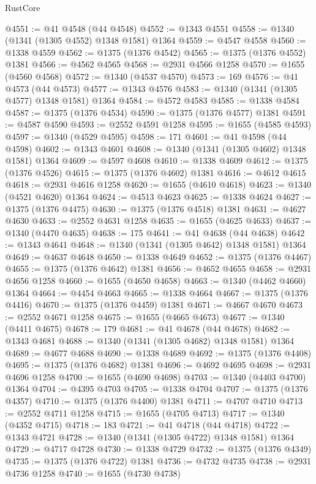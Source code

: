 \begin{lexlean}{RustCore}
\begin{coremodule}
@4551 := @41 @4548 (@44 @4548)
@4552 := @1343 @4551
@4558 := @1340 (@1341 (@1305 @4552) @1348 @1581) @1364
@4559 := @4547 @4558
@4560 := @1338 @4559
@4562 := @1375 (@1376 @4542)
@4565 := @1375 (@1376 @4552) @1381
@4566 := @4562 @4565
@4568 := @2931 @4566 @1258
@4570 := @1655 (@4560 @4568)
@4572 := @1340 (@4537 @4570)
@4573 := 169
@4576 := @41 @4573 (@44 @4573)
@4577 := @1343 @4576
@4583 := @1340 (@1341 (@1305 @4577) @1348 @1581) @1364
@4584 := @4572 @4583
@4585 := @1338 @4584
@4587 := @1375 (@1376 @4534)
@4590 := @1375 (@1376 @4577) @1381
@4591 := @4587 @4590
@4593 := @2552 @4591 @1258
@4595 := @1655 (@4585 @4593)
@4597 := @1340 (@4529 @4595)
@4598 := 171
@4601 := @41 @4598 (@44 @4598)
@4602 := @1343 @4601
@4608 := @1340 (@1341 (@1305 @4602) @1348 @1581) @1364
@4609 := @4597 @4608
@4610 := @1338 @4609
@4612 := @1375 (@1376 @4526)
@4615 := @1375 (@1376 @4602) @1381
@4616 := @4612 @4615
@4618 := @2931 @4616 @1258
@4620 := @1655 (@4610 @4618)
@4623 := @1340 (@4521 @4620) @1364
@4624 := @4513 @4623
@4625 := @1338 @4624
@4627 := @1375 (@1376 @4475)
@4630 := @1375 (@1376 @4518) @1381
@4631 := @4627 @4630
@4633 := @2552 @4631 @1258
@4635 := @1655 (@4625 @4633)
@4637 := @1340 (@4470 @4635)
@4638 := 175
@4641 := @41 @4638 (@44 @4638)
@4642 := @1343 @4641
@4648 := @1340 (@1341 (@1305 @4642) @1348 @1581) @1364
@4649 := @4637 @4648
@4650 := @1338 @4649
@4652 := @1375 (@1376 @4467)
@4655 := @1375 (@1376 @4642) @1381
@4656 := @4652 @4655
@4658 := @2931 @4656 @1258
@4660 := @1655 (@4650 @4658)
@4663 := @1340 (@4462 @4660) @1364
@4664 := @4454 @4663
@4665 := @1338 @4664
@4667 := @1375 (@1376 @4416)
@4670 := @1375 (@1376 @4459) @1381
@4671 := @4667 @4670
@4673 := @2552 @4671 @1258
@4675 := @1655 (@4665 @4673)
@4677 := @1340 (@4411 @4675)
@4678 := 179
@4681 := @41 @4678 (@44 @4678)
@4682 := @1343 @4681
@4688 := @1340 (@1341 (@1305 @4682) @1348 @1581) @1364
@4689 := @4677 @4688
@4690 := @1338 @4689
@4692 := @1375 (@1376 @4408)
@4695 := @1375 (@1376 @4682) @1381
@4696 := @4692 @4695
@4698 := @2931 @4696 @1258
@4700 := @1655 (@4690 @4698)
@4703 := @1340 (@4403 @4700) @1364
@4704 := @4395 @4703
@4705 := @1338 @4704
@4707 := @1375 (@1376 @4357)
@4710 := @1375 (@1376 @4400) @1381
@4711 := @4707 @4710
@4713 := @2552 @4711 @1258
@4715 := @1655 (@4705 @4713)
@4717 := @1340 (@4352 @4715)
@4718 := 183
@4721 := @41 @4718 (@44 @4718)
@4722 := @1343 @4721
@4728 := @1340 (@1341 (@1305 @4722) @1348 @1581) @1364
@4729 := @4717 @4728
@4730 := @1338 @4729
@4732 := @1375 (@1376 @4349)
@4735 := @1375 (@1376 @4722) @1381
@4736 := @4732 @4735
@4738 := @2931 @4736 @1258
@4740 := @1655 (@4730 @4738)

\end{coremodule}
\end{lexlean}
